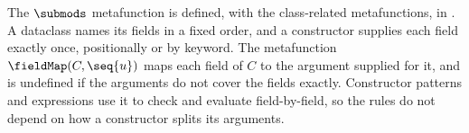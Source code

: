 The $\submods$ metafunction is defined, with the class-related metafunctions, in .
A dataclass names its fields in a fixed order, and a constructor supplies each field exactly once,
positionally or by keyword. The metafunction $\fieldMap(C, \seq{u})$ maps each field of $C$ to the argument supplied for it,
and is undefined if the arguments do not cover the fields exactly. Constructor patterns and expressions
use it to check and evaluate field-by-field, so the rules do not depend on how a constructor splits its
arguments.


